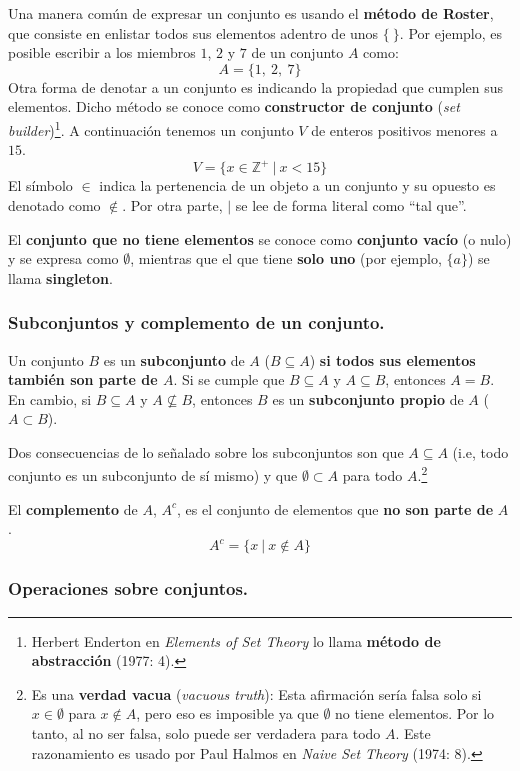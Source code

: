 \documentclass[12pt]{article}
\begin{document}
Una manera común de expresar un conjunto es usando el \textbf{método de Roster}, que consiste en enlistar todos sus elementos adentro de unos $\{ \ \}$. Por ejemplo, es posible escribir a los miembros $1$, $2$ y $7$ de un conjunto $A$ como:
\[
  A = \{1, \ 2, \ 7\}
\]
Otra forma de denotar a un conjunto es indicando la propiedad que cumplen sus elementos. Dicho método se conoce como \textbf{constructor de conjunto} (\textit{set builder})\footnote{Herbert Enderton en \textit{Elements of Set Theory} lo llama \textbf{método de abstracción} (1977: 4).}. A continuación tenemos un conjunto $V$ de enteros positivos menores a $15$.
\[
  V = \{x \in \mathbb{Z}^{+} \ | \ x < 15 \}
\]
El símbolo $\in$ indica la pertenencia de un objeto a un conjunto y su opuesto es denotado como $\notin$. Por otra parte, $|$ se lee de forma literal como ``tal que''.

El \textbf{conjunto que no tiene elementos} se conoce como \textbf{conjunto vacío} (o nulo) y se expresa como $\emptyset$, mientras que el que tiene \textbf{solo uno} (por ejemplo, $\{a\}$) se llama \textbf{singleton}.

\subsubsection{Subconjuntos y complemento de un conjunto.}

Un conjunto $B$ es un \textbf{subconjunto} de $A$ ($B \subseteq A$) \textbf{si todos sus elementos también son parte de $A$}. Si se cumple que $B \subseteq A$ y $A \subseteq B$, entonces $A = B$. En cambio, si $B \subseteq A$ y $A \nsubseteq B$, entonces $B$ es un \textbf{subconjunto propio} de $A$ ($A \subset B$).

Dos consecuencias de lo señalado sobre los subconjuntos son que $A \subseteq A$ (i.e, todo conjunto es un subconjunto de sí mismo) y que $\emptyset \subset A$ para todo $A$.\footnote{Es una \textbf{verdad vacua} (\textit{vacuous truth}): Esta afirmación sería falsa solo si $x \in \emptyset$ para $x \notin A$, pero eso es imposible ya que $\emptyset$ no tiene elementos. Por lo tanto, al no ser falsa, solo puede ser verdadera para todo $A$. Este razonamiento es usado por Paul Halmos en \textit{Naive Set Theory} (1974: 8).}

El \textbf{complemento} de $A$, $A^{c}$, es el conjunto de elementos que \textbf{no son parte de} $A$.
\[
  A^{c} = \{x \ | \ x \notin A\}
\]

\subsubsection{Operaciones sobre conjuntos.}
\end{document}
